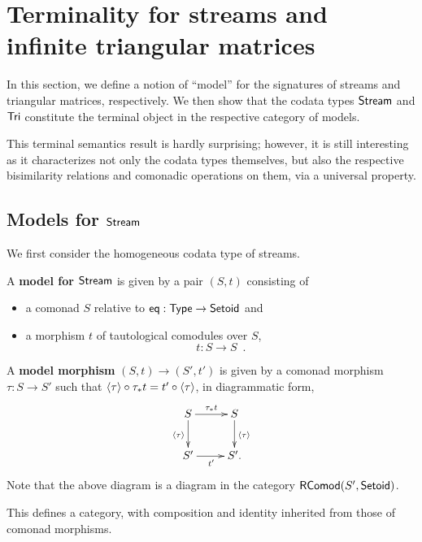 \documentclass[a4paper,USenglish]{lipics}
\newcommand{\fat}[1]{\textbf{#1}}
\begin{document}
\section{Terminality for streams and infinite triangular matrices}\label{sec:coalgebras_for_tri}

In this section, we define a notion of \enquote{model} for the signatures of streams and triangular matrices,
respectively. We then show that the codata types $\mathsf{Stream}$ and $\mathsf{Tri}$ constitute the terminal object in
the respective category of models.


This terminal semantics result is hardly surprising; however, it is still interesting as it characterizes not only the codata types themselves,
 but also the respective bisimilarity relations and comonadic operations on them, via a universal property.



\begin{Long}
\subsection{Models for $\mathsf{Stream}$}

We first consider the homogeneous codata type of streams.
\end{Long}

\begin{defn}
 \label{cat_stream}
  A \fat{model for $\mathsf{Stream}$} is given by a pair $(S,t)$ 
  consisting of
  \begin{itemize}
   \item a comonad $S$ relative to $\mathsf{eq} : \mathsf{Type} \to \mathsf{Setoid}$ and
   \item a morphism $t$ of tautological comodules over $S$, 
                   \[t : S \to S \enspace . \]
  \end{itemize}
  A \fat{model morphism} $(S,t) \to (S',t')$ is given by a comonad morphism $\tau : S \to S'$ such that
     $ {\langle {\tau} \rangle} \circ {\tau_*t} = {t'} \circ {\ensuremath{\langle {\tau} \rangle}}$, in diagrammatic form,
 \[
  \begin{xy}
   \xymatrix{
                  S \ar[r]^{\tau_*t} \ar[d]_{\induced{\tau}} & S \ar[d]^{\induced{\tau}}\\
                  S' \ar[r]_{t'} & S' .
   }
  \end{xy}
 \]
  Note that the above diagram is a diagram in the category $\mathsf{RComod}(S', \mathsf{Setoid})$. 
  
  This defines a category, with composition and identity inherited from those of comonad morphisms.

\end{defn}
\end{document}
